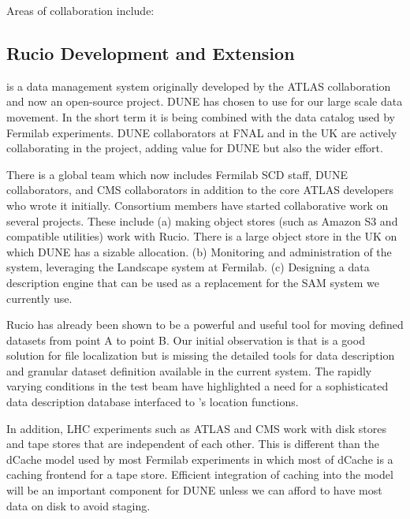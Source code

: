   Areas of collaboration include:



  \subsection{Rucio Development and Extension}

  \cite{Barisits:2019fyl}
  is a data management system originally developed by the ATLAS collaboration and now an open-source project.  DUNE has chosen to use  for our large scale data movement.  In the short term it is being combined with the  data catalog used by Fermilab experiments.  DUNE collaborators at FNAL and in the UK are actively collaborating in the  project, adding value for DUNE but also the wider effort.


  There is a global  team which now includes Fermilab SCD staff, DUNE collaborators, and CMS collaborators in addition to the core ATLAS developers who wrote it initially.  Consortium members have started collaborative work on several projects.   These include (a) making object stores (such as Amazon S3 and compatible utilities) work with Rucio.  There is a large object store in the UK on which DUNE has a sizable allocation.  (b) Monitoring  and administration of the  system, leveraging the Landscape system at Fermilab.  (c) Designing a  data description engine that can be used as a replacement for the SAM system we currently use.

  Rucio has already been shown to be a powerful and useful tool for moving defined datasets from point A to point B.  Our initial observation is that  is a good solution for file localization but is missing the detailed tools for data description and granular dataset definition available in the current  system.  The rapidly varying conditions in the test beam have highlighted a need for a sophisticated data description database interfaced to 's location functions.

  In addition,   LHC experiments such as ATLAS and CMS work with disk stores and tape stores that are independent of each other.  This is different than the dCache model used by most Fermilab experiments in which most of dCache is a caching frontend for a tape store.  Efficient integration of caching into the  model will be an important component for DUNE unless  we can afford to have most data on disk to avoid staging.

